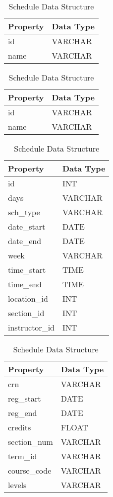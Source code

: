 	\begin{table}
		\ContinuedFloat
		\begin{subtable}[b]{.5\linewidth}
			\centering
			\begin{tabular}{ll}
				\toprule
				Property & Data Type \\
				\midrule
				id & VARCHAR \\
				name & VARCHAR \\
				\bottomrule
			\end{tabular}
			
			\caption{Subject Data Structure}
			\label{tbl:corpus-subject}
		\end{subtable}
		\begin{subtable}[b]{.5\linewidth}
			\centering
			\begin{tabular}{ll}
				\toprule
				Property & Data Type \\
				\midrule
				id & VARCHAR \\
				name & VARCHAR \\
				\bottomrule
			\end{tabular}
			
			\caption{Term Data Structure}
			\label{tbl:corpus-term}
		\end{subtable}
		\begin{subtable}[b]{.5\linewidth}
			\centering
			\begin{tabular}{ll}
				\toprule
				Property & Data Type \\
				\midrule
				id & INT \\
				days & VARCHAR \\
				sch\_type & VARCHAR \\
				date\_start & DATE \\
				date\_end & DATE \\
				week & VARCHAR \\
				time\_start & TIME \\
				time\_end & TIME \\
				location\_id & INT \\
				section\_id & INT \\
				instructor\_id & INT \\
				\bottomrule
			\end{tabular}
			
			\caption{Schedule Data Structure}
			\label{tbl:corpus-schedule}
		\end{subtable}
		\begin{subtable}[b]{.5\linewidth}
			\centering
			\begin{tabular}{ll}
				\toprule
				Property & Data Type \\
				\midrule
				crn & VARCHAR \\
				reg\_start & DATE \\
				reg\_end & DATE \\
				credits & FLOAT \\
				section\_num & VARCHAR \\
				term\_id & VARCHAR \\
				course\_code & VARCHAR \\
				levels & VARCHAR \\
				\bottomrule
			\end{tabular}
			

\end{subtable}
\end{table}
